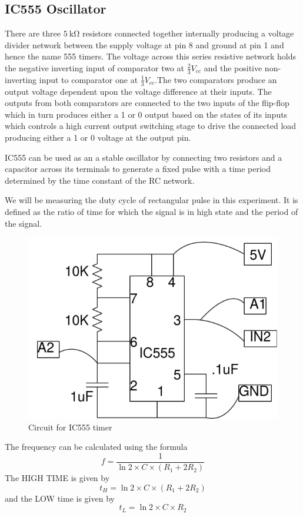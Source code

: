 \documentclass[%
 aip,
 amsmath,amssymb,
 reprint, floatfix%
]{revtex4-1}
\begin{document}
    \subsection{IC555 Oscillator}
    There are three $\SI{5}{\kilo \ohm}$ resistors connected together internally producing a voltage divider network between the supply voltage at pin 8 and ground at pin 1 and hence the name 555 timers. The voltage across this series resistive network holds the negative inverting input of comparator two at $\frac{2}{3}V_{cc}$ and the positive non-inverting input to comparator one at $\frac{1}{3}V_{cc}$.The two comparators produce an output voltage dependent upon the voltage difference at their inputs. The outputs from both comparators are connected to the two inputs of the flip-flop which in turn produces either a 1 or 0 output based on the states of its inputs which controls a high current output switching stage to drive the connected load producing either a 1 or 0 voltage at the output pin.
    \par
    IC555 can be used as an a stable oscillator by connecting two resistors and a capacitor across its terminals to generate a fixed pulse with a time period determined by the time constant of the RC network.
    \par
    We will be measuring the duty cycle of rectangular pulse in this experiment. It is defined as the ratio of time for which the signal is in high state and the period of the signal.
    \begin{figure}
        \centering
        \includegraphics[scale = 0.45]{Figures/ic555.png}
        \caption{Circuit for IC555 timer}
        \label{fig:ic555}
    \end{figure}
    \par
    The frequency can be calculated using the formula
    \begin{equation}
    \label{eq:freq}
        f = \dfrac{1}{\ln 2 \times C \times (R_1 + 2R_2)}
    \end{equation}
    The HIGH TIME is given by
    \begin{equation}
    \label{eq:high}
        t_H = \ln 2 \times C \times (R_1 + 2R_2)
    \end{equation}
    and the LOW time is given by
    \begin{equation}
    \label{eq:low}
        t_L = \ln 2 \times C \times R_2
    \end{equation}
\end{document}
